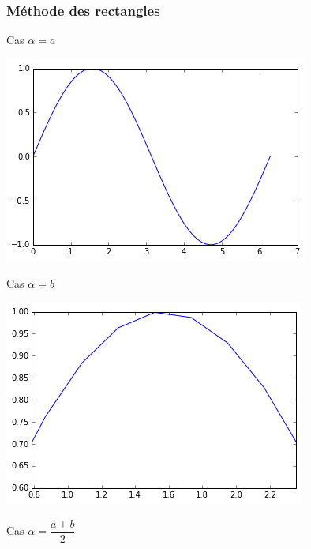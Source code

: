 \begin{frame}[fragile]
\frametitle{Méthode des rectangles}

\begin{minipage}{0.3\linewidth}
Cas $\alpha=a$ \\
\begin{center}
	\includegraphics[width=0.9\linewidth]{img/courbe1}
\end{center}
\end{minipage}\hfill
\begin{minipage}{0.3\linewidth}
Cas $\alpha=b$ \\
\begin{center}
	\includegraphics[width=0.9\linewidth]{img/courbe2}
\end{center}
\end{minipage}\hfill
\begin{minipage}{0.3\linewidth}
Cas $\alpha=\dfrac{a+b}{2}$ \\
\begin{center}

\end{center}
\end{minipage}
\end{frame}
